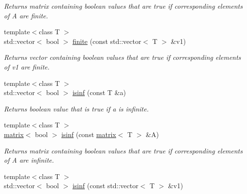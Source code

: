 \begin{DoxyCompactItemize}
\begin{DoxyCompactList}\small\item\em Returns matrix containing boolean values that are true if corresponding elements of A are finite. \end{DoxyCompactList}\item 
\hypertarget{namespacekeycpp_af4add0d0b269850e5f5fc1362d023666}{{\footnotesize template$<$class T $>$ }\\std\-::vector$<$ bool $>$ \hyperlink{namespacekeycpp_af4add0d0b269850e5f5fc1362d023666}{finite} (const std\-::vector$<$ T $>$ \&v1)}\label{namespacekeycpp_af4add0d0b269850e5f5fc1362d023666}

\begin{DoxyCompactList}\small\item\em Returns vector containing boolean values that are true if corresponding elements of v1 are finite. \end{DoxyCompactList}\item 
\hypertarget{namespacekeycpp_adca45e7f46618cf193b6b7bb59465a9d}{{\footnotesize template$<$class T $>$ }\\std\-::vector$<$ bool $>$ \hyperlink{namespacekeycpp_adca45e7f46618cf193b6b7bb59465a9d}{isinf} (const T \&a)}\label{namespacekeycpp_adca45e7f46618cf193b6b7bb59465a9d}

\begin{DoxyCompactList}\small\item\em Returns boolean value that is true if a is infinite. \end{DoxyCompactList}\item 
\hypertarget{namespacekeycpp_abf12e8a9c04720e074328bb1d34dce04}{{\footnotesize template$<$class T $>$ }\\\hyperlink{classkeycpp_1_1matrix}{matrix}$<$ bool $>$ \hyperlink{namespacekeycpp_abf12e8a9c04720e074328bb1d34dce04}{isinf} (const \hyperlink{classkeycpp_1_1matrix}{matrix}$<$ T $>$ \&A)}\label{namespacekeycpp_abf12e8a9c04720e074328bb1d34dce04}

\begin{DoxyCompactList}\small\item\em Returns matrix containing boolean values that are true if corresponding elements of A are infinite. \end{DoxyCompactList}\item 
\hypertarget{namespacekeycpp_a34d8480a27e0e6d14d687054a221c0a5}{{\footnotesize template$<$class T $>$ }\\std\-::vector$<$ bool $>$ \hyperlink{namespacekeycpp_a34d8480a27e0e6d14d687054a221c0a5}{isinf} (const std\-::vector$<$ T $>$ \&v1)}\label{namespacekeycpp_a34d8480a27e0e6d14d687054a221c0a5}


\end{DoxyCompactItemize}
